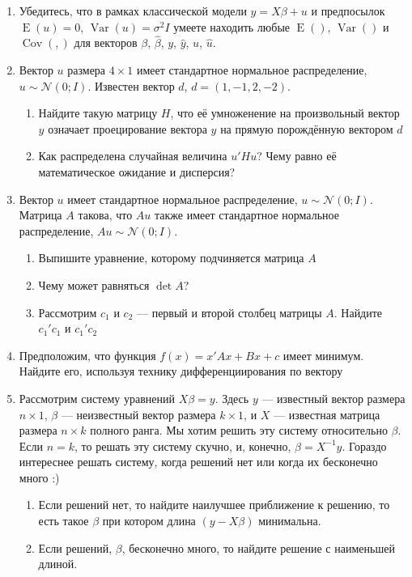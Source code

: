 \documentclass[12pt]{article}\usepackage[]{graphicx}\usepackage[svgnames]{xcolor}
\DeclareMathOperator{\Cov}{Cov}
\DeclareMathOperator{\Var}{Var}
\DeclareMathOperator{\E}{E}
\def \hb{\hat{\beta}}
\def \hy{\hat{y}}
\def \cN{\mathcal{N}}
\begin{document}
\begin{enumerate}

\item Убедитесь, что в рамках классической модели $y=X\beta + u$ и предпосылок $\E(u) = 0$, $\Var(u) = \sigma^2 I$  умеете находить любые $\E()$, $\Var()$ и $\Cov(,)$ для векторов $\beta$, $\hb$, $y$, $\hy$, $u$, $\hat u$.

\item Вектор $u$ размера $4 \times 1$ имеет стандартное нормальное распределение, $u \sim \cN (0; I)$. Известен вектор $d$, $d=(1, -1, 2, -2)$.

\begin{enumerate}
  \item Найдите такую матрицу $H$, что её умноженение на произвольный вектор $y$ означает проецирование вектора $y$ на прямую порождённую вектором $d$
  \item Как распределена случайная величина $u' H u$? Чему равно её математическое ожидание и дисперсия?
\end{enumerate}

\item Вектор $u$ имеет стандартное нормальное распределение, $u \sim \cN (0; I)$. Матрица $A$ такова, что $Au$ также имеет стандартное нормальное распределение, $Au \sim \cN(0;I)$.
\begin{enumerate}
  \item Выпишите уравнение, которому подчиняется матрица $A$
  \item Чему может равняться $\det A$?
  \item Рассмотрим $c_1$ и $c_2$ — первый и второй столбец матрицы $A$. Найдите $c_1'c_1$ и $c_1'c_2$
\end{enumerate}

\item Предположим, что функция $f(x) = x'Ax + Bx + c$ имеет минимум. Найдите его, используя технику дифференциирования по вектору

\item Рассмотрим систему уравнений $X\beta = y$. Здесь $y$ — известный вектор размера $n\times 1$, $\beta$ — неизвестный вектор размера $k\times 1$, и $X$ — известная матрица размера $n\times k$ полного ранга. Мы хотим решить эту систему относительно $\beta$. Если $n=k$, то решать эту систему скучно, и, конечно, $\beta = X^{-1}y$. Гораздо интереснее решать систему, когда решений нет или когда их бесконечно много :)

\begin{enumerate}
\item Если решений нет, то найдите наилучшее приближение к решению, то есть такое $\beta$ при котором длина $(y-X\beta)$ минимальна.
\item Если решений, $\beta$, бесконечно много, то найдите решение с наименьшей длиной.
\end{enumerate}


\end{enumerate}
\end{document}
